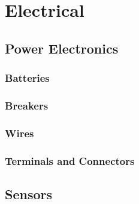 \chapter{Electrical}

\section{Power Electronics}

\subsection{Batteries}
\subsection{Breakers}
\subsection{Wires}

\subsection{Terminals and Connectors}

\section{Sensors}

